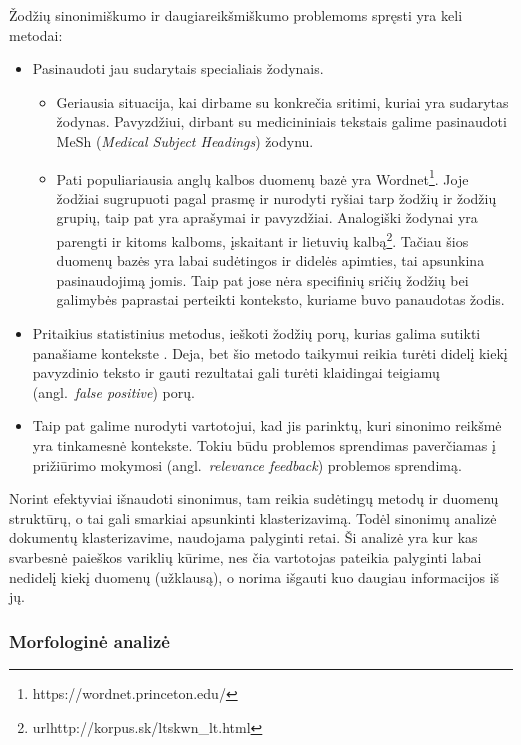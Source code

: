 \documentclass{VUMIFInfKursinis}
\newcommand{\ltang}[2]{#1 (angl.\  \textit{#2}) }
\begin{document}
Žodžių sinonimiškumo ir daugiareikšmiškumo problemoms spręsti yra keli
metodai:

\begin{itemize}
\item
  Pasinaudoti jau sudarytais specialiais žodynais.

  \begin{itemize}
    \item
    Geriausia situacija, kai dirbame su konkrečia sritimi, kuriai yra
    sudarytas žodynas. Pavyzdžiui, dirbant su medicininiais tekstais
    galime pasinaudoti MeSh (\textit{Medical Subject Headings}) žodynu.
  \item
    Pati populiariausia anglų kalbos duomenų bazė yra Wordnet\footnote{https://wordnet.princeton.edu/}.
    Joje žodžiai sugrupuoti pagal prasmę ir nurodyti ryšiai tarp žodžių
    ir žodžių grupių, taip pat yra aprašymai ir pavyzdžiai. Analogiški
    žodynai yra parengti ir kitoms kalboms, įskaitant ir lietuvių
    kalbą\footnote{url{http://korpus.sk/ltskwn\_lt.html}}. Tačiau šios
    duomenų bazės yra labai sudėtingos ir didelės apimties, tai
    apsunkina pasinaudojimą jomis. Taip pat jose nėra specifinių sričių
    žodžių bei galimybės paprastai perteikti konteksto, kuriame buvo
    panaudotas žodis.
  \end{itemize}
\item
  Pritaikius statistinius metodus, ieškoti žodžių porų, kurias galima
  sutikti panašiame kontekste \cite{baroni2004using}.
  Deja, bet šio metodo taikymui reikia turėti didelį kiekį pavyzdinio
  teksto ir gauti rezultatai gali turėti \ltang{klaidingai teigiamų}{false positive} porų. 
\item
  Taip pat galime nurodyti vartotojui, kad jis parinktų, kuri sinonimo
  reikšmė yra tinkamesnė kontekste. Tokiu būdu problemos sprendimas
  paverčiamas į \ltang{prižiūrimo mokymosi}{relevance feedback} problemos sprendimą.
\end{itemize}

Norint efektyviai išnaudoti sinonimus, tam reikia sudėtingų metodų ir
duomenų struktūrų, o tai gali smarkiai apsunkinti klasterizavimą. Todėl
sinonimų analizė dokumentų klasterizavime, naudojama palyginti retai. Ši
analizė yra kur kas svarbesnė paieškos variklių kūrime, nes čia
vartotojas pateikia palyginti labai nedidelį kiekį duomenų (užklausą), o
norima išgauti kuo daugiau informacijos iš jų.





\subsubsection{Morfologinė analizė}
\end{document}
